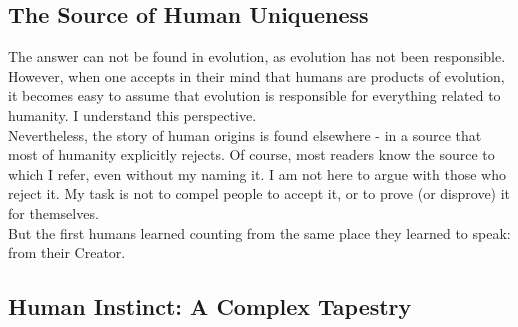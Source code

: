 \documentclass[12pt, oneside, openany]{book}
\begin{document}
\subsection{The Source of Human Uniqueness}
The answer can not be found in evolution, as evolution has not been responsible. However, when one accepts in their mind that humans are products of evolution, it becomes easy to assume that evolution is responsible for everything related to humanity. I understand this perspective.\\
Nevertheless, the story of human origins is found elsewhere - in a source that most of humanity explicitly rejects. Of course, most readers know the source to which I refer, even without my naming it. I am not here to argue with those who reject it. My task is not to compel people to accept it, or to prove (or disprove) it for themselves.\\
But the first humans learned counting from the same place they learned to speak: from their Creator.
\subsection{Human Instinct: A Complex Tapestry}
\end{document}
